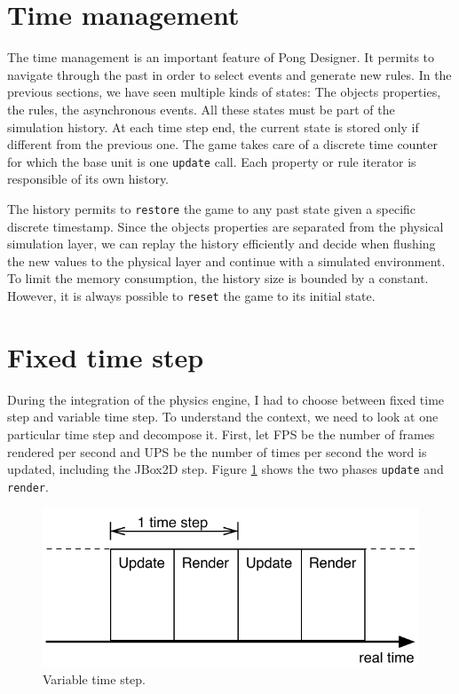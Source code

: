 \documentclass[11pt,a4paper]{article}
\begin{document}
\section{Time management}
The time management is an important feature of Pong Designer. It permits to navigate through the past in order to select events and generate new rules. In the previous sections, we have seen multiple kinds of states: The objects properties, the rules, the asynchronous events. All these states must be part of the simulation history. At each time step end, the current state is stored only if different from the previous one. The game takes care of a discrete time counter for which the base unit is one \texttt{update} call. Each property or rule iterator is responsible of its own history. 

The history permits to \texttt{restore} the game to any past state given a specific discrete timestamp. Since the objects properties are separated from the physical simulation layer, we can replay the history efficiently and decide when flushing the new values to the physical layer and continue with a simulated environment. To limit the memory consumption, the history size is bounded by a constant. However, it is always possible to  \texttt{reset} the game to its initial state.

\section{Fixed time step}
During the integration of the physics engine, I had to choose between fixed time step and variable time step. To understand the context, we need to look at one particular time step and decompose it. First, let FPS be the number of frames rendered per second and UPS be the number of times per second the word is updated, including the JBox2D step. Figure \ref{fig:variableTimeStep} shows the two phases \texttt{update} and \texttt{render}. 

\begin{figure}[h]
\centering
\includegraphics[scale = 0.8]{images/variableTimeStep} 
\caption{Variable time step.}
\label{fig:variableTimeStep}
\end{figure}
\end{document}
